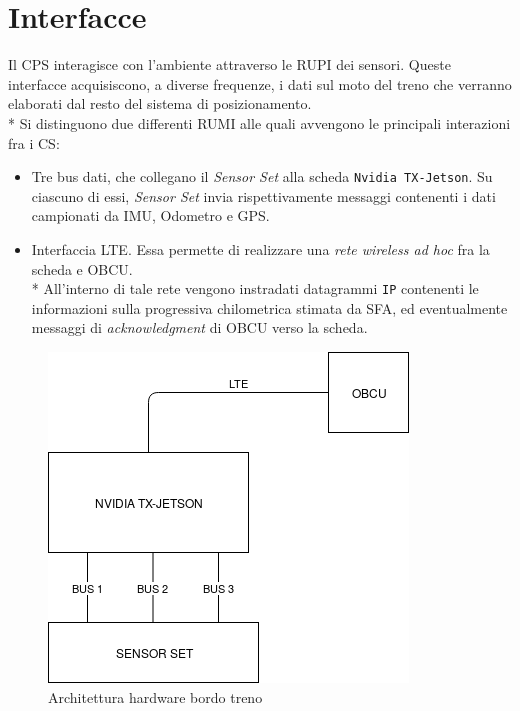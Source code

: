 	\section{Interfacce}
	Il CPS interagisce con l'ambiente attraverso le RUPI dei sensori. Queste interfacce acquisiscono, a diverse frequenze, i dati sul moto del treno che verranno elaborati dal resto del sistema di posizionamento.\\*
	Si distinguono due differenti RUMI alle quali avvengono le principali interazioni fra i CS:
	\begin{itemize}
		\item Tre bus dati, che collegano il \emph{Sensor Set} alla scheda \texttt{Nvidia TX-Jetson}. Su ciascuno di essi, \emph{Sensor Set} invia rispettivamente messaggi contenenti i dati campionati da IMU, Odometro e GPS.
		\item Interfaccia LTE. Essa permette di realizzare una \emph{rete wireless ad hoc} fra la scheda e OBCU.\\*
		All'interno di tale rete vengono instradati datagrammi \texttt{IP} contenenti le informazioni sulla progressiva chilometrica stimata da SFA, ed eventualmente messaggi di \emph{acknowledgment} di OBCU verso la scheda.
	\end{itemize}
	\begin{figure}[h]
		\centering
		\includegraphics[width=0.7\linewidth]{img/TrainDiagram}
		\caption{Architettura hardware bordo treno}
		\label{fig:tdiagram}
	\end{figure}
	
